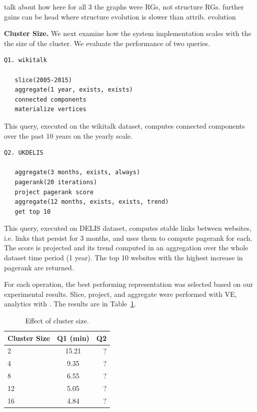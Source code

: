 talk about how here for all 3 the graphs were RGs, not structure RGs. further gains can be head where structure evolution is slower than attrib. evolution

{\bf Cluster Size.}  We next examine how the system implementation
scales with the the size of the cluster.  We evaluate the performance
of two queries.

\begin{small}
\begin{verbatim}
Q1. wikitalk

   slice(2005-2015)
   aggregate(1 year, exists, exists)
   connected components
   materialize vertices
\end{verbatim}
\end{small}

This query, executed on the wikitalk dataset, computes connected
components over the past 10 years on the yearly scale.

\begin{small}
\begin{verbatim}
Q2. UKDELIS

   aggregate(3 months, exists, always)
   pagerank(20 iterations)
   project pagerank score
   aggregate(12 months, exists, exists, trend)
   get top 10
\end{verbatim}
\end{small}

This query, executed on DELIS dataset, computes stable links between
websites, i.e. links that persist for 3 months, and uses them to
compute pagerank for each.  The score is projected and its trend
computed in an aggregation over the whole dataset time period (1
year).  The top 10 websites with the highest increase in pagerank are
returned.

For each operation, the best performing representation was selected
based on our experimental results.  Slice, project, and aggregate were
performed with VE, analytics with \hg.  The results are in
Table~\ref{tab:clustersize}.

\begin{table}
\caption{Effect of cluster size.}
\small
\begin{tabular}{| l | c | r |}
\hline
\multicolumn{1}{|l|}{\bfseries Cluster Size} & \multicolumn{1}{c|}{\bfseries Q1 (min)} & \multicolumn{1}{r}{\bfseries Q2} \\ \hline
2 & 15.21 & ? \\ \hline
4 & 9.35 & ? \\ \hline
8 & 6.55 & ? \\ \hline
12 & 5.05 & ? \\ \hline
16 & 4.84 & ? \\ \hline
\end{tabular}
\label{tab:clustersize}
\end{table}
